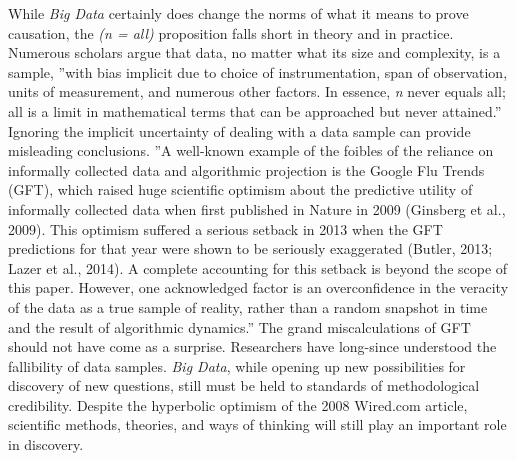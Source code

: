 \documentclass[sigconf]{acmart}
\begin{document}
	While {\em Big Data} certainly does change the norms of what it means to prove causation, the {\em (n = all)}  proposition falls short in theory and in practice. Numerous scholars argue that data, no matter what its size and complexity, is a sample, ''with bias implicit due to choice of instrumentation, span of observation, units of measurement, and numerous other factors. In essence, {\em n} never equals all; all is a limit in mathematical terms that can be approached but never attained.''\cite{Keystone} Ignoring the implicit uncertainty of dealing with a data sample can provide misleading conclusions. ''A well-known example of the foibles of the reliance on informally collected data and algorithmic projection is the Google Flu Trends (GFT), which raised huge scientific optimism about the predictive utility of informally collected data when first published in Nature in 2009 (Ginsberg et al., 2009). This optimism suffered a serious setback in 2013 when the GFT predictions for that year were shown to be seriously exaggerated (Butler, 2013; Lazer et al., 2014). A complete accounting for this setback is beyond the scope of this paper. However, one acknowledged factor is an overconfidence in the veracity of the data as a true sample of reality, rather than a random snapshot in time and the result of algorithmic dynamics.''\cite{Keystone} The grand miscalculations of GFT should not have come as a surprise. Researchers have long-since understood the fallibility of data samples. {\em Big Data}, while opening up new possibilities for discovery of new questions, still must be held to standards of methodological credibility. Despite the hyperbolic optimism of the 2008 Wired.com article, scientific methods, theories, and ways of thinking will still play an important role in discovery.
\end{document}
